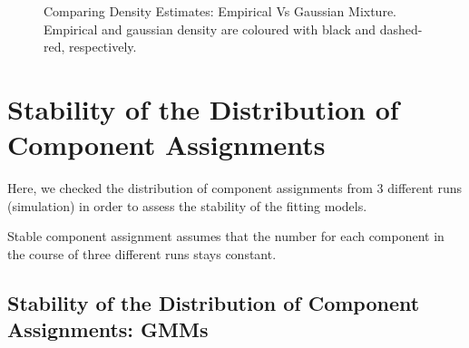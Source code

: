 \documentclass{article}\usepackage[]{graphicx}\usepackage[]{color}
\begin{document}
\begin{figure}[!htp]
    \caption{Comparing Density Estimates: Empirical Vs Gaussian Mixture. Empirical and gaussian density are coloured with black and dashed-red, respectively.}
    \label{fig:empVsnb}
\end{figure}
\clearpage

\section{Stability of the Distribution of Component Assignments}
Here, we checked the distribution of component assignments from 3 different runs (simulation) in order to assess the stability of the fitting models.

Stable component assignment assumes that the number for each component in the course of three different runs stays constant.

\subsection{Stability of the Distribution of Component Assignments: GMMs}
\end{document}
